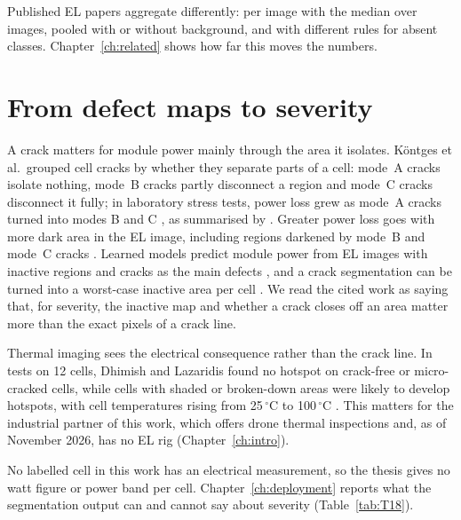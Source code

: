 Published EL papers aggregate differently: per image with the median over images, pooled with or without background, and
with different rules for absent classes. Chapter~\ref{ch:related} shows how far this moves the numbers.

\section{From defect maps to severity}\label{sec:bg_severity}

A crack matters for module power mainly through the area it isolates. Köntges et al.\ grouped cell cracks by whether they
separate parts of a cell: mode~A cracks isolate nothing, mode~B cracks partly disconnect a region and mode~C cracks
disconnect it fully; in laboratory stress tests, power loss grew as mode~A cracks turned into modes B and C
\citep{kontges2011risk}, as summarised by \citet{pratt2025ictas}. Greater power loss goes with more dark area in the EL image,
including regions darkened by mode~B and mode~C cracks \citep{pratt2025ictas}. Learned models predict module power from EL
images with inactive regions and cracks as the main defects \citep{hoffmann2021power}, and a crack segmentation can be
turned into a worst-case inactive area per cell \citep{chen2022pvsc}. We read the cited work as saying that, for severity,
the inactive map and whether a crack closes off an area matter more than the exact pixels of a crack line.

Thermal imaging sees the electrical consequence rather than the crack line. In tests on 12 cells, Dhimish and Lazaridis
found no hotspot on crack-free or micro-cracked cells, while cells with shaded or broken-down areas were likely to develop
hotspots, with cell temperatures rising from 25\,$^{\circ}$C to 100\,$^{\circ}$C \citep{dhimish2021hotspots}. This matters
for the industrial partner of this work, which offers drone thermal inspections and, as of November 2026, has no EL rig
(Chapter~\ref{ch:intro}).

No labelled cell in this work has an electrical measurement, so the thesis gives no watt figure or power band per cell.
Chapter~\ref{ch:deployment} reports what the segmentation output can and cannot say about severity (Table~\ref{tab:T18}).
